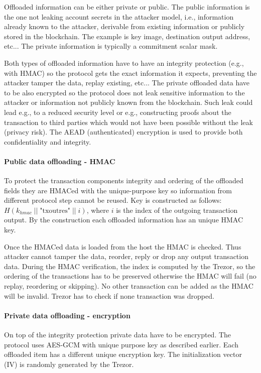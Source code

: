 \documentclass[]{article}
\begin{document}
Offloaded information can be either private or public. The public information is the one not leaking account secrets in the attacker model, i.e., information already known to the attacker, derivable from existing information or publicly stored in the blockchain. The example is key image, destination output address, etc... The private information is typically a commitment scalar mask.

Both types of offloaded information have to have an integrity protection (e.g., with HMAC) so the protocol gets the exact information it expects, preventing the attacker tamper the data, replay existing, etc...
The private offloaded data have to be also encrypted so the protocol does not leak sensitive information to the attacker or information not publicly known from the blockchain. Such leak could lead e.g., to a reduced security level or e.g., constructing proofs about the transaction to third parties which would not have been possible without the leak (privacy risk). The AEAD (authenticated) encryption is used to provide both confidentiality and integrity.


\paragraph{Public data offloading - HMAC}
To protect the transaction components integrity and ordering of the offloaded fields they are HMACed with the unique-purpose key so information from different protocol step cannot be reused. Key is constructed as follows: $H(k_{hmac} \; || \; \text{"txoutres"} \; || \; i)$, where $i$ is the index of the outgoing transaction output. By the construction each offloaded information has an unique HMAC key.

Once the HMACed data is loaded from the host the HMAC is checked. Thus attacker cannot tamper the data, reorder, reply or drop any output transaction data. During the HMAC verification, the index is computed by the Trezor, so the ordering of the transactions has to be preserved otherwise the HMAC will fail (no replay, reordering or skipping). No other transaction can be added as the HMAC will be invalid. Trezor has to check if none transaction was dropped.

\paragraph{Private data offloading - encryption}
On top of the integrity protection private data have to be encrypted.
The protocol uses AES-GCM with unique purpose key as described earlier. Each offloaded item has a different unique encryption key.
The initialization vector (IV) is randomly generated by the Trezor. 
\end{document}
